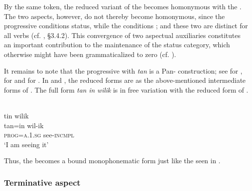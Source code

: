 \documentclass[output=paper]{langsci/langscibook}
\begin{document}
By the same token, the reduced variant of the  becomes homonymous with the  . The two aspects, however, do not thereby become homonymous, since the progressive conditions  status, while the  conditions ; and these two are distinct for all verbs (cf. \citealt{Lehmann2014}, §3.4.2). This convergence of two aspectual auxiliaries constitutes an important contribution to the maintenance of the status category, which otherwise might have been grammaticalized to zero (cf. ).



It remains to note that the progressive with \textit{tan} is a Pan- construction; see \citet[93, 97]{Bruce1968} for , \citet[30]{Hofling1991} for  and \citet[125]{Danziger2011} for . In  and , the reduced forms are as the above-mentioned intermediate forms of  . The full form \textit{tan in wilik} is in free variation with the reduced form of  \citep[61, 97]{Bruce1968}.\largerpage[2]


\ea\label{ex:lehmann:46}
 \\
      tin          wilik\\
\gll   tan=in        wil-ik\\
\textsc{prog=a.1.sg}    see-\textsc{incmpl}\\
\glt `I am seeing it' \citep[34]{Bruce1968}
\z


Thus, the  becomes a bound monophonematic form just like the   seen in .


\subsubsection{Terminative aspect}\label{sec:lehmann:4.7.4}
\end{document}
